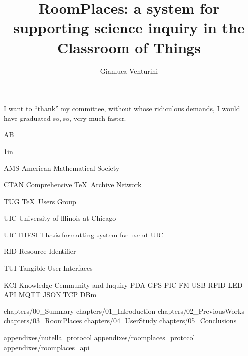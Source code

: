 \documentclass{uicthesi}
\begin{document}

\title{RoomPlaces: a system for supporting science inquiry in the Classroom of Things}
\author{Gianluca Venturini}
\maketitle


\acknowledgements
{I want to ``thank'' my committee, without whose ridiculous demands, I
would have graduated so, so, very much faster.

\begin{flushright}
AB %
\end{flushright}}


\tableofcontents
\listoftables
\listoffigures
\listofabbreviations
\begin{list}
{}
{\setlength
   {}{1in}
    \setlength{\leftmargin}{1.5in}
    \setlength{\labelsep}{.5in}
    \setlength{\rightmargin}{\leftmargin}}
\item[AMS\hfill] American Mathematical Society
\item[CTAN\hfill] Comprehensive \TeX\ Archive Network
\item[TUG\hfill] \TeX\ Users Group
\item[UIC\hfill] University of Illinois at Chicago
\item[UICTHESI\hfill] Thesis formatting system for use at UIC
\item[RID\hfill] Resource Identifier
\item[TUI\hfill] Tangible User Interfaces
\item[KCI\hfill] Knowledge  Community  and  Inquiry
PDA
GPS
PIC
FM
USB
RFID
LED
API
MQTT
JSON
TCP
DBm
\end{list}

\squarebrackets %
\captionsetup[table]{skip=10pt} %

 {chapters/00_Summary}
 {chapters/01_Introduction}
 {chapters/02_PreviousWorks}
 {chapters/03_RoomPlaces}
 {chapters/04_UserStudy}
 {chapters/05_Conclusions}



\appendices
\newpage
\appendix

 {appendixes/nutella_protocol}
 {appendixes/roomplaces_protocol}
 {appendixes/roomplaces_api}

\nocite{*}
\bibformb


\newpage
\vita
\begin{singlespace}
\end{singlespace}
\end{document}
